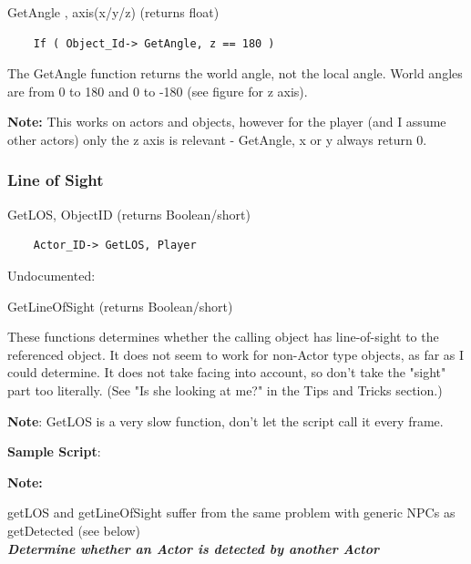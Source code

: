 

GetAngle , axis(x/y/z) (returns float)

\begin{lstlisting}
	If ( Object_Id-> GetAngle, z == 180 )
\end{lstlisting}

The GetAngle function returns the world angle, not the local angle.
World angles are from 0 to 180 and 0 to -180 (see figure for z axis).

\textbf{Note:} This works on actors and objects, however for the player
(and I assume other actors) only the z axis is relevant - GetAngle, x or
y always return 0.


\hypertarget{line-of-sight}{%
\subsubsection{Line of Sight}\label{line-of-sight}}

GetLOS, ObjectID (returns Boolean/short)

\begin{lstlisting}
	Actor_ID-> GetLOS, Player
\end{lstlisting}

Undocumented:

GetLineOfSight (returns Boolean/short)

These functions determines whether the calling object has line-of-sight
to the referenced object. It does not seem to work for non-Actor type
objects, as far as I could determine. It does not take facing into
account, so don't take the "sight" part too literally. (See "Is she
looking at me?" in the Tips and Tricks section.)

\textbf{Note}: GetLOS is a very slow function, don't let the script call
it every frame.

\textbf{Sample Script}:




\textbf{Note:}

getLOS and getLineOfSight suffer from the same problem with generic NPCs
as getDetected (see below)\\
\protect\hypertarget{_Toc182634542}{}{}\emph{\textbf{Determine whether
an Actor is detected by another Actor}}

